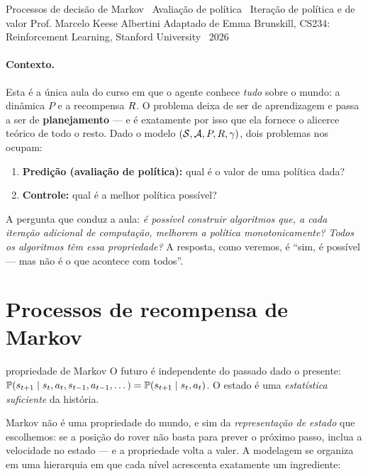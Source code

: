 \documentclass[11pt, a4paper]{article}
\begin{document}
     {Processos de decisão de Markov \textbullet\ Avaliação de política \textbullet\ Iteração de política e de valor}
     {Prof. Marcelo Keese Albertini}
     {Adaptado de Emma Brunskill, CS234: Reinforcement Learning, Stanford University \textbullet\ 2026}

\paragraph{Contexto.} Esta é a única aula do curso em que o agente conhece \emph{tudo}
sobre o mundo: a dinâmica $P$ e a recompensa $R$. O problema deixa de ser de
aprendizagem e passa a ser de \textbf{planejamento} --- e é exatamente por isso que ela
fornece o alicerce teórico de todo o resto. Dado o modelo $(\mathcal{S}, \mathcal{A}, P, R, \gamma)$,
dois problemas nos ocupam:

\begin{enumerate}
  \item \textbf{Predição (avaliação de política):} qual é o valor de uma política dada?
  \item \textbf{Controle:} qual é a melhor política possível?
\end{enumerate}

A pergunta que conduz a aula: \emph{é possível construir algoritmos que, a cada iteração
adicional de computação, melhorem a política monotonicamente? Todos os algoritmos têm
essa propriedade?} A resposta, como veremos, é ``sim, é possível --- mas não é o que
acontece com todos''.

\section{Processos de recompensa de Markov}

\begin{defbox}{propriedade de Markov}
O futuro é independente do passado dado o presente:
$\mathbb{P}(s_{t+1} \mid s_t, a_t, s_{t-1}, a_{t-1}, \dots) = \mathbb{P}(s_{t+1} \mid s_t, a_t)$.
O estado é uma \emph{estatística suficiente} da história.
\end{defbox}

Markov não é uma propriedade do mundo, e sim da \emph{representação de estado} que
escolhemos: se a posição do rover não basta para prever o próximo passo, inclua a
velocidade no estado --- e a propriedade volta a valer. A modelagem se organiza em uma
hierarquia em que cada nível acrescenta exatamente um ingrediente:
\end{document}
